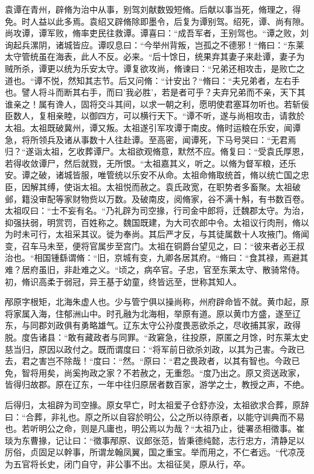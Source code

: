 \documentclass[12pt,UTF8]{ctexbook}
\begin{document}
袁谭在青州，辟脩为治中从事，别驾刘献数毁短脩。后献以事当死，脩理之，得免。时人益以此多焉。袁绍又辟脩除即墨令，后复为谭别驾。绍死，谭、尚有隙。尚攻谭，谭军败，脩率吏民往救谭。谭喜曰：“成吾军者，王别驾也。“谭之败，刘询起兵漯阴，诸城皆应。谭叹息曰：“今举州背叛，岂孤之不德邪！“脩曰：“东莱太守管统虽在海表，此人不反。必来。“后十馀日，统果弃其妻子来赴谭，妻子为贼所杀，谭更以统为乐安太守。谭复欲攻尚，脩谏曰：“兄弟还相攻击，是败亡之道也。“谭不悦，然知其志节。后又问脩：“计安出？“脩曰：“夫兄弟者，左右手也。譬人将斗而断其右手，而曰'我必胜'，若是者可乎？夫弃兄弟而不亲，天下其谁亲之！属有谗人，固将交斗其间，以求一朝之利，愿明使君塞耳勿听也。若斩佞臣数人，复相亲睦，以御四方，可以横行天下。“谭不听，遂与尚相攻击，请救於太祖。太祖既破冀州，谭又叛。太祖遂引军攻谭于南皮。脩时运粮在乐安，闻谭急，将所领兵及诸从事数十人往赴谭。至高密，闻谭死，下马号哭曰：“无君焉归？“遂诣太祖，乞收葬谭尸。太祖欲观脩意，默然不应。脩复曰：“受袁氏厚恩，若得收敛谭尸，然后就戮，无所恨。“太祖嘉其义，听之。以脩为督军粮，还乐安。谭之破，诸城皆服，唯管统以乐安不从命。太祖命脩取统首，脩以统亡国之忠臣，因解其缚，使诣太祖。太祖悦而赦之。袁氏政宽，在职势者多畜聚。太祖破邺，籍没审配等家财物赀以万数。及破南皮，阅脩家，谷不满十斛，有书数百卷。太祖叹曰：“士不妄有名。“乃礼辟为司空掾，行司金中郎将，迁魏郡太守。为治，抑强扶弱，明赏罚，百姓称之。魏国既建，为大司农郎中令。太祖议行肉刑，脩以为时未可行，太祖采其议。徙为奉尚。其后严才反，与其徒属数十人攻掖门。脩闻变，召车马未至，便将官属步至宫门。太祖在铜爵台望见之，曰：“彼来者必王叔治也。“相国锺繇谓脩：“旧，京城有变，九卿各居其府。“脩曰：“食其禄，焉避其难？居府虽旧，非赴难之义。“顷之，病卒官。子忠，官至东莱太守、散骑常侍。初，脩识高柔于弱冠，异王基于幼童，终皆远至，世称其知人。

邴原字根矩，北海朱虚人也。少与管宁俱以操尚称，州府辟命皆不就。黄巾起，原将家属入海，住郁洲山中。时孔融为北海相，举原有道。原以黄巾方盛，遂至辽东，与同郡刘政俱有勇略雄气。辽东太守公孙度畏恶欲杀之，尽收捕其家，政得脱。度告诸县：“敢有藏政者与同罪。“政窘急，往投原，原匿之月馀，时东莱太史慈当归，原因以政付之。既而谓度曰：“将军前日欲杀刘政，以其为己害。今政已去，君之害岂不除哉！“度曰：“然。“原曰：“君之畏政者，以其有智也。今政已免，智将用矣，尚奚拘政之家？不若赦之，无重怨。“度乃出之。原又资送政家，皆得归故郡。原在辽东，一年中往归原居者数百家，游学之士，教授之声，不绝。

后得归，太祖辟为司空掾。原女早亡，时太祖爱子仓舒亦没，太祖欲求合葬，原辞曰：“合葬，非礼也。原之所以自容於明公，公之所以待原者，以能守训典而不易也。若听明公之命，则是凡庸也，明公焉以为哉？“太祖乃止，徙署丞相徵事。崔琰为东曹掾，记让曰：“徵事邴原、议郎张范，皆秉德纯懿，志行忠方，清静足以厉俗，贞固足以幹事，所谓龙翰凤翼，国之重宝。举而用之，不仁者远。“代凉茂为五官将长史，闭门自守，非公事不出。太祖征吴，原从行，卒。
\end{document}
